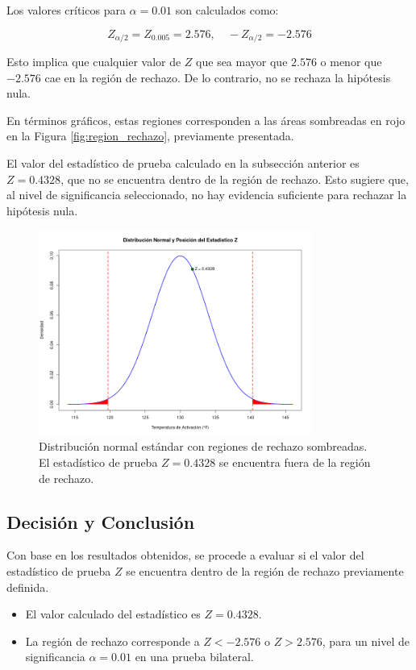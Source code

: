 \documentclass[a4paper,12pt]{article}
\begin{document}
Los valores críticos para \( \alpha = 0.01 \) son calculados como:

\[
Z_{\alpha/2} = Z_{0.005} = 2.576, \quad -Z_{\alpha/2} = -2.576
\]

Esto implica que cualquier valor de \( Z \) que sea mayor que \( 2.576 \) o menor que \( -2.576 \) cae en la región de rechazo. De lo contrario, no se rechaza la hipótesis nula.

En términos gráficos, estas regiones corresponden a las áreas sombreadas en rojo en la Figura \ref{fig:region_rechazo}, previamente presentada.

El valor del estadístico de prueba calculado en la subsección anterior es \( Z = 0.4328 \), que no se encuentra dentro de la región de rechazo. Esto sugiere que, al nivel de significancia seleccionado, no hay evidencia suficiente para rechazar la hipótesis nula.
\begin{figure}[h!]
\centering
\includegraphics[width=0.8\textwidth]{posicion_Z.png}
\caption{Distribución normal estándar con regiones de rechazo sombreadas. El estadístico de prueba \( Z = 0.4328 \) se encuentra fuera de la región de rechazo.}
\label{fig:posicion_Z}
\end{figure}


\subsection{Decisión y Conclusión}

Con base en los resultados obtenidos, se procede a evaluar si el valor del estadístico de prueba \( Z \) se encuentra dentro de la región de rechazo previamente definida.

\begin{itemize}
    \item El valor calculado del estadístico es \( Z = 0.4328 \).
    \item La región de rechazo corresponde a \( Z < -2.576 \) o \( Z > 2.576 \), para un nivel de significancia \( \alpha = 0.01 \) en una prueba bilateral.
\end{itemize}
\end{document}
